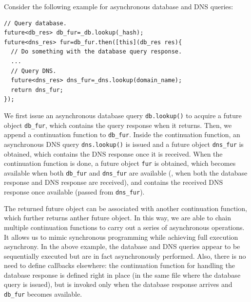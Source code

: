 Consider the following example for asynchronous database and DNS queries:

\vspace{-1mm}
\begin{lstlisting}[style=InlineStyle]
// Query database.
future<db_res> db_fur=_db.lookup(_hash);
future<dns_res> fur=db_fur.then([this](db_res res){
  // Do something with the database query response.
  ...
  // Query DNS.
  future<dns_res> dns_fur=_dns.lookup(domain_name);
  return dns_fur;
});
\end{lstlisting}
\vspace{-1mm}

\noindent We first issue an asynchronous database query \lstinline[style=InlineStyle]{db.lookup()} to acquire a future object \lstinline[style=InlineStyle]{db_fur}, which contains the query response when it returns. Then, we append a continuation function to \lstinline[style=InlineStyle]{db_fur}. Inside the continuation function, an asynchronous DNS query \lstinline[style=InlineStyle]{dns.lookup()} is issued and a future object \lstinline[style=InlineStyle]{dns_fur} is obtained, which contains the DNS response once it is received. When the continuation function is done, a future object \lstinline[style=InlineStyle]{fur} is obtained, %
 which becomes available when both \lstinline[style=InlineStyle]{db_fur} and \lstinline[style=InlineStyle]{dns_fur} are available (\ie, when both the database response and DNS response are received), and contains the received DNS response once available (passed from \lstinline[style=InlineStyle]{dns_fur}).

The returned future object can be associated with another continuation function, which further returns anther future object. In this way, we are able to chain multiple continuation functions to carry out a series of asynchronous operations. It allows us %
to mimic synchronous programming while achieving full execution asynchrony. In the above example, the database and DNS queries appear to be sequentially executed but are in fact asynchronously performed. %
 Also, there is no need to define callbacks elsewhere: the continuation function for handling the database response is defined right in place (in the same file where the database query is issued), but is invoked only when the database response arrives and \lstinline[style=InlineStyle]{db_fur} becomes available.

